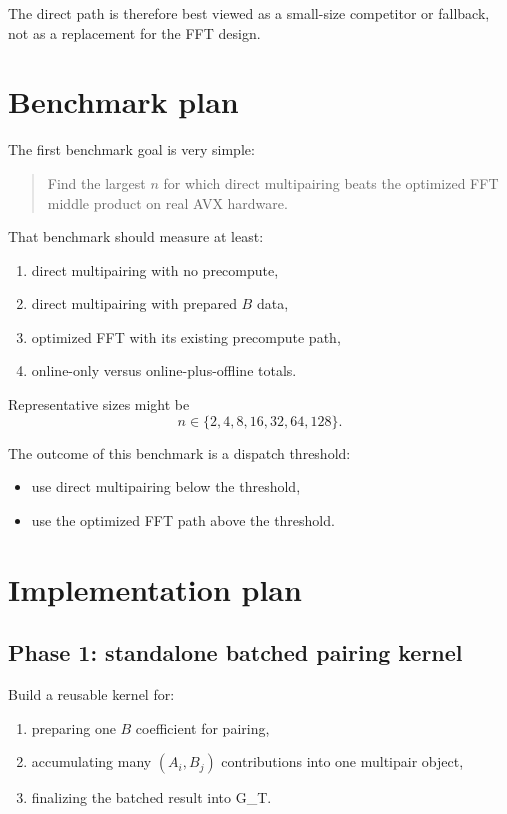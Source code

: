 \documentclass[11pt]{article}
\newcommand{\GT}{G_T}
\begin{document}
The direct path is therefore best viewed as a small-size competitor or fallback,
not as a replacement for the FFT design.

\section{Benchmark plan}

The first benchmark goal is very simple:
\begin{quote}
Find the largest $n$ for which direct multipairing beats the optimized FFT
middle product on real AVX hardware.
\end{quote}

That benchmark should measure at least:
\begin{enumerate}[itemsep=0.3em, topsep=0.4em]
  \item direct multipairing with no precompute,
  \item direct multipairing with prepared $B$ data,
  \item optimized FFT with its existing precompute path,
  \item online-only versus online-plus-offline totals.
\end{enumerate}

Representative sizes might be
\[
n \in \{2,4,8,16,32,64,128\}.
\]

The outcome of this benchmark is a dispatch threshold:
\begin{itemize}[itemsep=0.3em, topsep=0.4em]
  \item use direct multipairing below the threshold,
  \item use the optimized FFT path above the threshold.
\end{itemize}

\section{Implementation plan}

\subsection{Phase 1: standalone batched pairing kernel}

Build a reusable kernel for:
\begin{enumerate}[itemsep=0.3em, topsep=0.4em]
  \item preparing one $B$ coefficient for pairing,
  \item accumulating many $(A_i, B_j)$ contributions into one multipair object,
  \item finalizing the batched result into \GT.
\end{enumerate}
\end{document}
